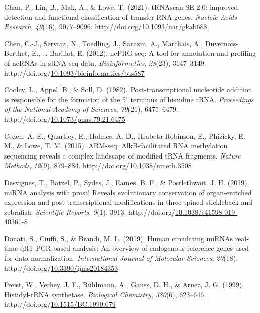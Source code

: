 \documentclass[12pt,twoside]{reedthesis}
\newlength{\cslhangindent}
\newenvironment{CSLReferences}[2] %
 {%
  \setlength{\parindent}{0pt}
  \ifodd #1 \everypar{\setlength{\hangindent}{\cslhangindent}}\ignorespaces\fi
  \ifnum #2 > 0
  \setlength{\parskip}{#2\baselineskip}
  \fi
 }%
 {}
\begin{document}
\begin{CSLReferences}{1}{0}
\leavevmode{}%
Chan, P., Lin, B., Mak, A., \& Lowe, T. (2021). tRNAscan-SE 2.0: improved detection and functional classification of transfer RNA genes. \emph{Nucleic Acids Research}, \emph{49}(16), 9077--9096. http://doi.org/\href{https://doi.org/10.1093/nar/gkab688}{10.1093/nar/gkab688}

\leavevmode{}%
Chen, C.-J., Servant, N., Toedling, J., Sarazin, A., Marchais, A., Duvernois-Berthet, E., \ldots{} Barillot, E. (2012). ncPRO-seq: A tool for annotation and profiling of ncRNAs in sRNA-seq data. \emph{Bioinformatics}, \emph{28}(23), 3147--3149. http://doi.org/\href{https://doi.org/10.1093/bioinformatics/bts587}{10.1093/bioinformatics/bts587}

\leavevmode{}%
Cooley, L., Appel, B., \& Soll, D. (1982). Post-transcriptional nucleotide addition is responsible for the formation of the 5' terminus of histidine tRNA. \emph{Proceedings of the National Academy of Sciences}, \emph{79}(21), 6475--6479. http://doi.org/\href{https://doi.org/10.1073/pnas.79.21.6475}{10.1073/pnas.79.21.6475}

\leavevmode{}%
Cozen, A. E., Quartley, E., Holmes, A. D., Hrabeta-Robinson, E., Phizicky, E. M., \& Lowe, T. M. (2015). ARM-seq: AlkB-facilitated RNA methylation sequencing reveals a complex landscape of modified tRNA fragments. \emph{Nature Methods}, \emph{12}(9), 879--884. http://doi.org/\href{https://doi.org/10.1038/nmeth.3508}{10.1038/nmeth.3508}

\leavevmode{}%
Desvignes, T., Batzel, P., Sydes, J., Eames, B. F., \& Postlethwait, J. H. (2019). miRNA analysis with prost! Reveals evolutionary conservation of organ-enriched expression and post-transcriptional modifications in three-spined stickleback and zebrafish. \emph{Scientific Reports}, \emph{9}(1), 3913. http://doi.org/\href{https://doi.org/10.1038/s41598-019-40361-8}{10.1038/s41598-019-40361-8}

\leavevmode{}%
Donati, S., Ciuffi, S., \& Brandi, M. L. (2019). Human circulating miRNAs real-time qRT-PCR-based analysis: An overview of endogenous reference genes used for data normalization. \emph{International Journal of Molecular Sciences}, \emph{20}(18). http://doi.org/\href{https://doi.org/10.3390/ijms20184353}{10.3390/ijms20184353}

\leavevmode{}%
Freist, W., Verhey, J. F., Rühlmann, A., Gauss, D. H., \& Arnez, J. G. (1999). Histidyl-tRNA synthetase. \emph{Biological Chemistry}, \emph{380}(6), 623--646. http://doi.org/\href{https://doi.org/10.1515/BC.1999.079}{10.1515/BC.1999.079}


\end{CSLReferences}
\end{document}
